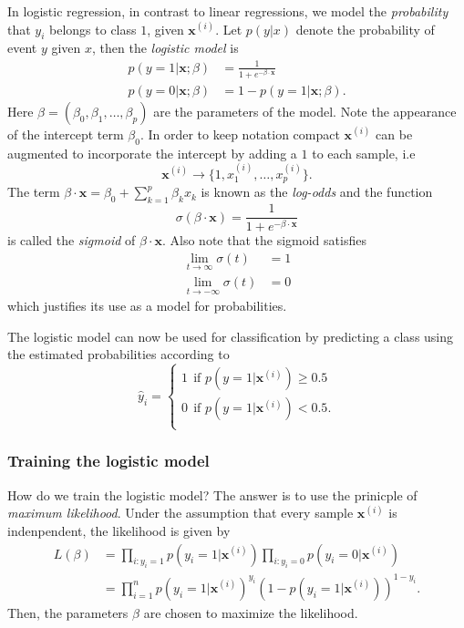 \documentclass[a4paper, twocolumn]{article}
\begin{document}
In logistic regression, in contrast to linear regressions, we model the \textit{probability} that $y_i$ belongs 
to class $1$, given $\mathbf{x}^{(i)}$. Let $p(y|x)$ denote the probability of event $y$ given $x$,
then the \textit{logistic model} is 
\begin{align}
 p \left(y=1 | \mathbf{x}; \beta \right) &= \frac{1}{1+e^{-\beta \cdot \mathbf{x}}} \\
 p \left(y=0 | \mathbf{x}; \beta \right) &= 1 - p \left(y=1 | \mathbf{x}; \beta \right).
\end{align}
Here $\beta = (\beta_0, \beta_1, \dots, \beta_p)$ are the parameters of the model. Note the appearance of the intercept 
term $\beta_0$. In order to keep notation compact $\mathbf{x}^{(i)}$ can be augmented to incorporate the intercept by adding 
a $1$ to each sample, i.e 
\begin{equation*}
 \mathbf{x}^{(i)} \rightarrow \{ 1, x_1^{(i)}, \dots, x_p^{(i)} \}.
\end{equation*}
The term $\beta \cdot \mathbf{x} = \beta_0 + \sum_{k=1}^p \beta_k x_k $ is known as the \textit{log-odds} and the function 
\begin{equation}
\sigma(\beta \cdot \mathbf{x}) = \frac{1}{1+e^{-\beta \cdot \mathbf{x}}} 
\end{equation}
is called the \textit{sigmoid} of $\beta \cdot \mathbf{x}$. Also note that the sigmoid satisfies 
\begin{align}
 \lim_{t \rightarrow \infty} \sigma(t) &= 1 \\
 \lim_{t \rightarrow -\infty} \sigma(t) &= 0
\end{align}
which justifies its use as a model for probabilities.

The logistic model can now be used for classification by predicting a class using the estimated probabilities according to 
\begin{equation}
 \hat{y}_i = \begin{cases}
            1 \ \ \text{if }  p \left(y=1 | \mathbf{x}^{(i)} \right) \geq 0.5 \\
            0 \ \ \text{if }  p \left(y=1 | \mathbf{x}^{(i)} \right) < 0.5. \\
           \end{cases}
\end{equation}
\subsubsection{Training the logistic model}
How do we train the logistic model? The answer is to use the prinicple of \textit{maximum likelihood}. Under the assumption 
that every sample $\mathbf{x}^{(i)}$ is indenpendent, the likelihood is given by 
\begin{align}
 L(\beta) &= \prod_{i : y_i = 1} p(y_i=1 | \mathbf{x}^{(i)}) \prod_{i : y_i = 0} p(y_i=0 | \mathbf{x}^{(i)}) \nonumber \\
 &= \prod_{i=1}^n p(y_i=1 | \mathbf{x}^{(i)})^{y_i} ( 1-p(y_i=1 | \mathbf{x}^{(i)}))^{1-y_i}.
\end{align}
Then, the parameters $\beta$ are chosen to maximize the likelihood. 
\end{document}
